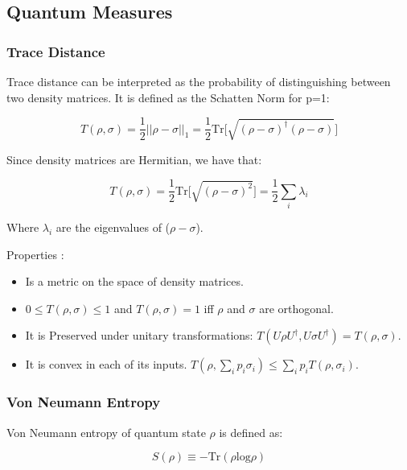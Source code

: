 \subsection{Quantum Measures}
\label{Subsection: Quantum Measures}

\subsubsection{Trace Distance}
\label{Subsubsec: Trace distance}

Trace distance can be interpreted as the probability of distinguishing between two density matrices. It is defined as the Schatten Norm for p=1:

\begin{equation}
    T(\rho,\sigma) = \frac{1}{2} || \rho - \sigma ||_1 = \frac{1}{2} \mathrm{Tr} \bigg[\sqrt{(\rho - \sigma)^{\dagger} (\rho - \sigma)} \bigg]
\end{equation}

Since density matrices are Hermitian, we have that:

\begin{equation}
    T(\rho, \sigma) = \frac{1}{2} \mathrm{Tr} \bigg[\sqrt{(\rho - \sigma)^2} \bigg] = \frac{1}{2} \sum_i \lambda_i
\end{equation}

Where $\lambda_i$ are the eigenvalues of ($\rho - \sigma$).

Properties \cite{nielsen_chuang_2010}:
\begin{itemize}
    \item Is a metric on the space of density matrices. 
    \item $0 \leq T(\rho, \sigma) \leq 1$ and $T(\rho,\sigma) = 1$ iff $\rho$ and $\sigma$ are orthogonal.
    \item It is Preserved under unitary transformations: $T(U\rho U^\dagger,U\sigma U^\dagger) = T(\rho, \sigma)$.
    \item It is convex in each of its inputs. $T(\rho,\sum_i p_i \sigma_i) \leq \sum_i p_i T(\rho,\sigma_i)$.
\end{itemize}

\subsubsection{Von Neumann Entropy}
\label{Subsubsec: Von Neumann entropy}

Von Neumann entropy of quantum state $\rho$ is defined as:

\begin{equation}
    S(\rho) \equiv - \mathrm{Tr}(\rho \mathrm{log} \rho)
\end{equation}

